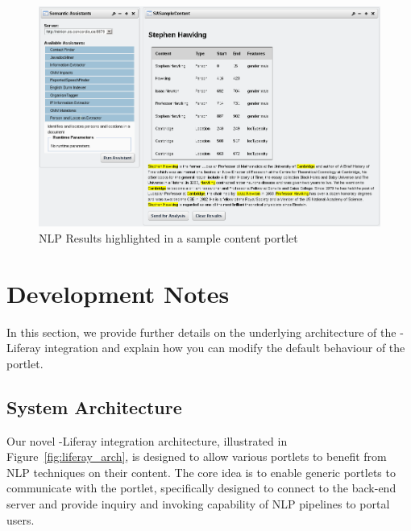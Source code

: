 \begin{figure}
\centering
\includegraphics[scale=0.6]{pictures/liferay_results_portlet.png}
\caption{NLP Results highlighted in a sample content portlet}
\label{fig:liferay_results_portlet}
\end{figure}

\section{Development Notes}
In this section, we provide further details on the underlying architecture of the \sa-Liferay integration and explain how you can modify the default behaviour of the \sa portlet.

\subsection{System Architecture}
Our novel \sa-Liferay integration architecture, illustrated in Figure~\ref{fig:liferay_arch}, is designed to allow various portlets to benefit from NLP techniques on their content. The core idea is to enable generic portlets to communicate with the \sa portlet, specifically designed to connect to the back-end \sa server and provide inquiry and invoking capability of NLP pipelines to portal users. 

